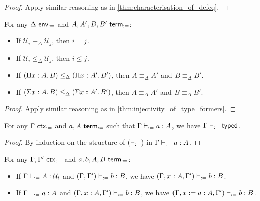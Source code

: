 \documentclass[twoside]{report}
\begin{document}
\begin{proof}
Apply similar reasoning as in \cref{thm:characterisation_of_defeq}.
\end{proof}

\begin{proposition}
\label{thm:def_injectivity_of_type_formers}
For any $\Delta \ \mathsf{env}_{:=}$ and $A, A', B, B' \ \mathsf{term}_{:=}$:
\begin{itemize}[noitemsep]
    \item If $\mathcal U_i \equiv_\Delta \mathcal U_j$, then $i = j$.
    \item If $\mathcal U_i \leq_\Delta \mathcal U_j$, then $i \leq j$.
    \item If $(\Pi{x} : {A}.\,{B}) \leq_\Delta (\Pi{x} : {A'}.\,{B'})$, then $A \equiv_\Delta A'$ and $B \equiv_\Delta B'$.
    \item If $(\Sigma{x} : {A}.\,{B}) \leq_\Delta (\Sigma{x} : {A'}.\,{B'})$, then $A \equiv_\Delta A'$ and $B \equiv_\Delta B'$.
\end{itemize}
\end{proposition}

\begin{proof}
Apply similar reasoning as in \cref{thm:injectivity_of_type_formers}.
\end{proof}

\begin{proposition}[Context]
\label{thm:def_context}
For any $\Gamma \ \mathsf{ctx}_{:=}$ and $a, A \ \mathsf{term}_{:=}$ such that $\Gamma \vdash_{:=} a : A$, we have $\Gamma \vdash_{:=} \mathsf{typed}$.
\end{proposition}

\begin{proof}
By induction on the structure of $(\vdash_{:=})$ in $\Gamma \vdash_{:=} a : A$.
\end{proof}

\begin{proposition}[Weakening]
\label{thm:def_weakening}
For any $\Gamma, \Gamma' \ \mathsf{ctx}_{:=}$ and $a, b, A, B \ \mathsf{term}_{:=}$:
\begin{itemize}[noitemsep]
    \item If $\Gamma \vdash_{:=} A : \mathcal U_i$ and $(\Gamma, \Gamma') \vdash_{:=} b : B$, we have $(\Gamma, x : A, \Gamma') \vdash_{:=} b : B$.
    \item If $\Gamma \vdash_{:=} a : A$ and $(\Gamma, x : A, \Gamma') \vdash_{:=} b : B$, we have $(\Gamma, x := a : A, \Gamma') \vdash_{:=} b : B$.
\end{itemize}
\end{proposition}
\end{document}
